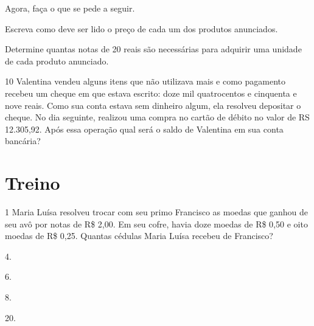 Agora, faça o que se pede a seguir.

\begin{escolha}
\item
  Escreva como deve ser lido o preço de cada um dos produtos anunciados.\\


\item
  Determine quantas notas de 20 reais são necessárias para adquirir uma unidade de cada produto anunciado.\\

\end{escolha}

\num{10} Valentina vendeu alguns itens que não utilizava mais e como pagamento
recebeu um cheque em que estava escrito: doze mil quatrocentos e
cinquenta e nove reais. Como sua conta estava sem dinheiro algum, ela
resolveu depositar o cheque. No dia seguinte, realizou uma compra no
cartão de débito no valor de RS 12.305,92. Após essa operação qual será o
saldo de Valentina em sua conta bancária?

\pagebreak

\section*{Treino}

\num{1} Maria Luísa resolveu trocar com seu primo Francisco as moedas que ganhou de seu avô por notas de R\$ 2,00. Em seu cofre, havia doze moedas de R\$ 0,50
e oito moedas de R\$ 0,25. Quantas cédulas Maria Luísa recebeu de Francisco?

\begin{escolha}
\begin{multicols}{2}
\item
  4.
\item
  6.
\item
  8.
\item
  20.
\end{multicols}
\end{escolha}


